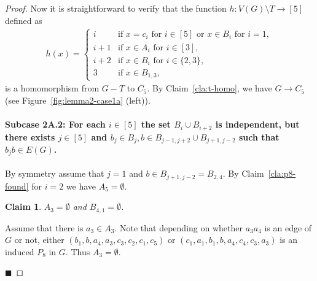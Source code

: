 \documentclass[11pt,a4paper]{article}
\theoremstyle{mystyle}
\newtheorem{claim}{Claim}[theorem]
\newenvironment{claimproof}{\noindent {\emph{Proof of Claim.}}}{\hfill$\blacksquare$\medskip}
\newcommand{\jorik}[1]{\textcolor{blue}{Comment by Jorik: #1}}
\begin{document}
\begin{proof}
Now it is straightforward to verify that the function $h : V(G) \setminus T \to [5]$ defined as
\begin{align*}
h(x)=\begin{cases}
i & \textrm{if }x=c_i \textrm{ for }i\in [5] \textrm{ or }x\in B_i \textrm{ for }i=1, \\
i+1 & \textrm{if }x\in A_i \textrm{ for }i\in [3], \\
i+2 & \textrm{if }x\in B_i\textrm{ for }i\in \{2,3\}, \\ 
3 & \textrm{if }x\in B_{1,3},
\end{cases}
\end{align*}
is a homomorphism from $G - T$ to $C_5$. By Claim~\ref{cla:t-homo}, we have $G \to C_5$ (see Figure~\ref{fig:lemma2-case1a} (left)).


\paragraph{Subcase 2A.2: For each $i \in [5]$ the set $B_i \cup B_{i+2}$ is independent, but there exists $j \in [5]$ and $b_j \in B_j, b \in B_{j-1,j+2} \cup B_{j+1,j-2}$ such that $b_jb \in E(G)$. }
By symmetry assume that $j=1$ and $b\in B_{j+1,j-2}=B_{2,4}$.
By Claim~\ref{cla:p8-found} for $i=2$ we have $A_5=\emptyset$. %

\begin{claim}
    $A_3=\emptyset$ and $B_{4,1}=\emptyset$.
\end{claim}
\begin{claimproof}
Assume that there is $a_3 \in A_3$. Note that depending on whether $a_3a_4$ is an edge of $G$ or not, either $(b_{1},b,a_4,a_3,c_3,c_2,c_1,c_5)$ or $(c_1,a_1,b_1,b,a_4,c_4,c_3,a_3)$ is an induced $P_8$ in $G$. Thus $A_3=\emptyset$.


\end{claimproof}
\end{proof}
\end{document}
